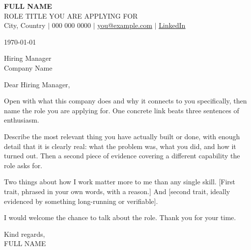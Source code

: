 \documentclass[11pt,a4paper]{article}
\begin{document}
\begin{center}
    \textbf{\Huge FULL NAME} \\ \vspace{2pt}
    \small ROLE TITLE YOU ARE APPLYING FOR \\ \vspace{3pt}
    \small
    City, Country $|$ 000 000 0000 $|$
    \href{mailto:you@example.com}{\underline{you@example.com}} $|$
    \href{https://www.linkedin.com/in/yourprofile/}{\underline{LinkedIn}}
\end{center}

\vspace{6pt}
\today

\vspace{8pt}
Hiring Manager\\
Company Name

\vspace{10pt}
Dear Hiring Manager,

\vspace{6pt}

Open with what this company does and why it connects to you specifically, then name the
role you are applying for. One concrete link beats three sentences of enthusiasm.

Describe the most relevant thing you have actually built or done, with enough detail that
it is clearly real: what the problem was, what you did, and how it turned out. Then a
second piece of evidence covering a different capability the role asks for.

Two things about how I work matter more to me than any single skill. [First trait, phrased
in your own words, with a reason.] And [second trait, ideally evidenced by something
long-running or verifiable].

I would welcome the chance to talk about the role. Thank you for your time.

\vspace{10pt}
Kind regards,\\[6pt]
FULL NAME
\end{document}
